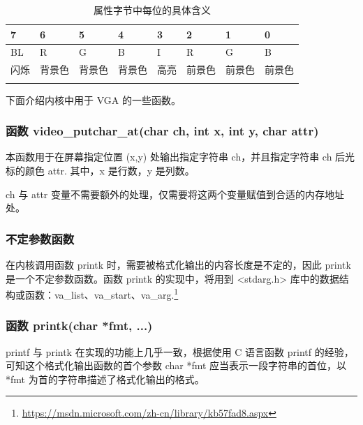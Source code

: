 \begin{table}[]
\caption{属性字节中每位的具体含义}
\label{tab:属性字节中每位的具体含义}
\begin{tabular}{llllllll}
\hline
\multicolumn{1}{|l|}{7} & \multicolumn{1}{l|}{6} & \multicolumn{1}{l|}{5} & \multicolumn{1}{l|}{4} & \multicolumn{1}{l|}{3} & \multicolumn{1}{l|}{2} & \multicolumn{1}{l|}{1} & \multicolumn{1}{l|}{0} \\ \hline
\multicolumn{1}{|l|}{BL} & \multicolumn{1}{l|}{R} & \multicolumn{1}{l|}{G} & \multicolumn{1}{l|}{B} & \multicolumn{1}{l|}{I} & \multicolumn{1}{l|}{R} & \multicolumn{1}{l|}{G} & \multicolumn{1}{l|}{B} \\ \hline
\multicolumn{1}{|l|}{闪烁} & \multicolumn{1}{l|}{背景色} & \multicolumn{1}{l|}{背景色} & \multicolumn{1}{l|}{背景色} & \multicolumn{1}{l|}{高亮} & \multicolumn{1}{l|}{前景色} & \multicolumn{1}{l|}{前景色} & \multicolumn{1}{l|}{前景色} \\ \hline
 &  &  &  &  &  &  & 
\end{tabular}
\end{table}

下面介绍内核中用于 VGA 的一些函数。

\subsubsection{函数 video\_putchar\_at(char ch, int x, int y, char attr)}

本函数用于在屏幕指定位置 (x,y) 处输出指定字符串 ch，并且指定字符串 ch 后光标的颜色 attr. 其中，x 是行数，y 是列数。

ch 与 attr 变量不需要额外的处理，仅需要将这两个变量赋值到合适的内存地址处。

\subsubsection{不定参数函数}

在内核调用函数 printk 时，需要被格式化输出的内容长度是不定的，因此 printk 是一个不定参数函数。函数 printk 的实现中，将用到 <stdarg.h> 库中的数据结构或函数：va\_list、va\_start、va\_arg.\footnote{\url{https://msdn.microsoft.com/zh-cn/library/kb57fad8.aspx}}

\subsubsection{函数 printk(char *fmt, ...)}

printf 与 printk 在实现的功能上几乎一致，根据使用 C 语言函数 printf 的经验，可知这个格式化输出函数的首个参数 char *fmt 应当表示一段字符串的首位，以 *fmt 为首的字符串描述了格式化输出的格式。

